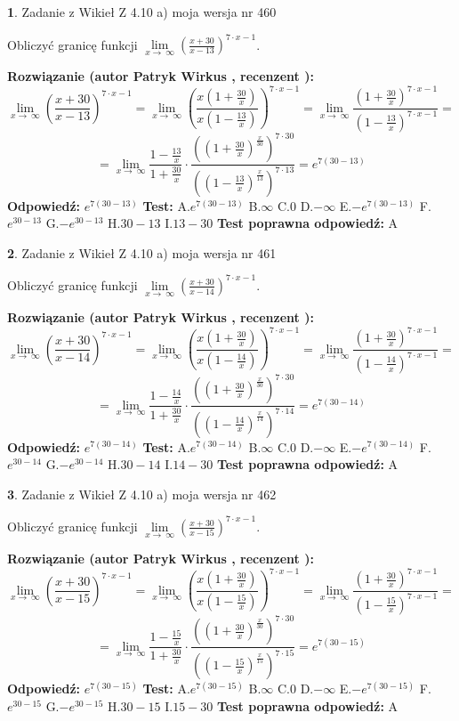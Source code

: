\documentclass[12pt, a4paper]{article}
\theoremstyle{definition} %
\newtheorem{zad}{}
\newcommand{\zadStart}[1]{\begin{zad}#1\newline}
\newcommand{\zadStop}{\end{zad}}
\newcommand{\rozwStart}[2]{\noindent \textbf{Rozwiązanie (autor #1 , recenzent #2): }\newline}
\newcommand{\rozwStop}{\newline}
\newcommand{\odpStart}{\noindent \textbf{Odpowiedź:}\newline}
\newcommand{\odpStop}{\newline}
\newcommand{\testStart}{\noindent \textbf{Test:}\newline}
\newcommand{\testStop}{\newline}
\newcommand{\kluczStart}{\noindent \textbf{Test poprawna odpowiedź:}\newline}
\newcommand{\kluczStop}{\newline}
\begin{document}
\zadStart{Zadanie z Wikieł Z 4.10 a) moja wersja nr 460}


Obliczyć granicę funkcji  $\lim\limits_{x\to\ \infty}(\frac{x+30}{x-13})^{7\cdot x-1}$.
\zadStop
\rozwStart{Patryk Wirkus}{}
$$\lim\limits_{x\to\ \infty}(\frac{x+30}{x-13})^{7\cdot x-1} = \lim\limits_{x\to\ \infty}(\frac{x(1+\frac{30}{x})}{x(1-\frac{13}{x})})^{7\cdot x-1}=\lim\limits_{x\to\ \infty}\frac{(1+\frac{30}{x})^{7\cdot x-1}}{(1-\frac{13}{x})^{7\cdot x-1}}=$$
$$=\lim\limits_{x\to\ \infty}\frac{1-\frac{13}{x}}{1+\frac{30}{x}}\cdot\frac{((1+\frac{30}{x})^{\frac{x}{30}})^{7\cdot30}}{((1-\frac{13}{x})^{\frac{x}{13}})^{7\cdot13}}=e^{7(30-13)}$$
\rozwStop
\odpStart
$e^{7(30-13)}$
\odpStop
\testStart
A.$e^{7(30-13)}$ B.$\infty$ C.$0$ D.$-\infty$ E.$-e^{7(30-13)}$
F.$e^{30-13}$ G.$-e^{30-13}$
H.$30-13$
I.$13-30$
\testStop
\kluczStart
A
\kluczStop



\zadStart{Zadanie z Wikieł Z 4.10 a) moja wersja nr 461}


Obliczyć granicę funkcji  $\lim\limits_{x\to\ \infty}(\frac{x+30}{x-14})^{7\cdot x-1}$.
\zadStop
\rozwStart{Patryk Wirkus}{}
$$\lim\limits_{x\to\ \infty}(\frac{x+30}{x-14})^{7\cdot x-1} = \lim\limits_{x\to\ \infty}(\frac{x(1+\frac{30}{x})}{x(1-\frac{14}{x})})^{7\cdot x-1}=\lim\limits_{x\to\ \infty}\frac{(1+\frac{30}{x})^{7\cdot x-1}}{(1-\frac{14}{x})^{7\cdot x-1}}=$$
$$=\lim\limits_{x\to\ \infty}\frac{1-\frac{14}{x}}{1+\frac{30}{x}}\cdot\frac{((1+\frac{30}{x})^{\frac{x}{30}})^{7\cdot30}}{((1-\frac{14}{x})^{\frac{x}{14}})^{7\cdot14}}=e^{7(30-14)}$$
\rozwStop
\odpStart
$e^{7(30-14)}$
\odpStop
\testStart
A.$e^{7(30-14)}$ B.$\infty$ C.$0$ D.$-\infty$ E.$-e^{7(30-14)}$
F.$e^{30-14}$ G.$-e^{30-14}$
H.$30-14$
I.$14-30$
\testStop
\kluczStart
A
\kluczStop



\zadStart{Zadanie z Wikieł Z 4.10 a) moja wersja nr 462}


Obliczyć granicę funkcji  $\lim\limits_{x\to\ \infty}(\frac{x+30}{x-15})^{7\cdot x-1}$.
\zadStop
\rozwStart{Patryk Wirkus}{}
$$\lim\limits_{x\to\ \infty}(\frac{x+30}{x-15})^{7\cdot x-1} = \lim\limits_{x\to\ \infty}(\frac{x(1+\frac{30}{x})}{x(1-\frac{15}{x})})^{7\cdot x-1}=\lim\limits_{x\to\ \infty}\frac{(1+\frac{30}{x})^{7\cdot x-1}}{(1-\frac{15}{x})^{7\cdot x-1}}=$$
$$=\lim\limits_{x\to\ \infty}\frac{1-\frac{15}{x}}{1+\frac{30}{x}}\cdot\frac{((1+\frac{30}{x})^{\frac{x}{30}})^{7\cdot30}}{((1-\frac{15}{x})^{\frac{x}{15}})^{7\cdot15}}=e^{7(30-15)}$$
\rozwStop
\odpStart
$e^{7(30-15)}$
\odpStop
\testStart
A.$e^{7(30-15)}$ B.$\infty$ C.$0$ D.$-\infty$ E.$-e^{7(30-15)}$
F.$e^{30-15}$ G.$-e^{30-15}$
H.$30-15$
I.$15-30$
\testStop
\kluczStart
A
\kluczStop
\end{document}
